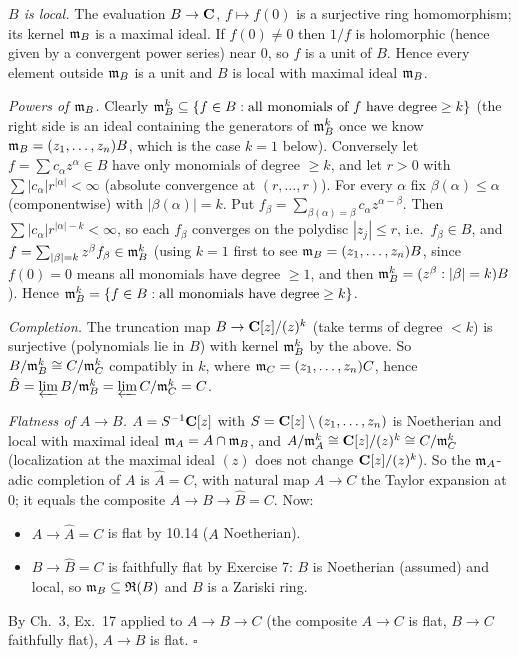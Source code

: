 \documentclass[11pt]{article}
\begin{document}
\pf
\emph{$B$ is local.} The evaluation $B\to\mathbf C$, $f\mapsto f(0)$ is a surjective ring homomorphism; its kernel $\mathfrak m_B$ is a maximal ideal. If $f(0)\ne0$ then $1/f$ is holomorphic (hence given by a convergent power series) near $0$, so $f$ is a unit of $B$. Hence every element outside $\mathfrak m_B$ is a unit and $B$ is local with maximal ideal $\mathfrak m_B$.

\emph{Powers of $\mathfrak m_B$.} Clearly $\mathfrak m_B^k\subseteq\{f\in B:\text{all monomials of }f\text{ have degree}\ge k\}$ (the right side is an ideal containing the generators of $\mathfrak m_B^k$ once we know $\mathfrak m_B=(z_1,\dots,z_n)B$, which is the case $k=1$ below). Conversely let $f=\sum c_\alpha z^\alpha\in B$ have only monomials of degree $\ge k$, and let $r>0$ with $\sum|c_\alpha|r^{|\alpha|}<\infty$ (absolute convergence at $(r,\dots,r)$). For every $\alpha$ fix $\beta(\alpha)\le\alpha$ (componentwise) with $|\beta(\alpha)|=k$. Put $f_\beta=\sum_{\beta(\alpha)=\beta}c_\alpha z^{\alpha-\beta}$. Then $\sum|c_\alpha|r^{|\alpha|-k}<\infty$, so each $f_\beta$ converges on the polydisc $|z_j|\le r$, i.e.\ $f_\beta\in B$, and $f=\sum_{|\beta|=k}z^\beta f_\beta\in\mathfrak m_B^k$ (using $k=1$ first to see $\mathfrak m_B=(z_1,\dots,z_n)B$, since $f(0)=0$ means all monomials have degree $\ge1$, and then $\mathfrak m_B^k=(z^\beta:|\beta|=k)B$). Hence $\mathfrak m_B^k=\{f\in B:\text{all monomials have degree}\ge k\}$.

\emph{Completion.} The truncation map $B\to\mathbf C[z]/(z)^k$ (take terms of degree $<k$) is surjective (polynomials lie in $B$) with kernel $\mathfrak m_B^k$ by the above. So $B/\mathfrak m_B^k\cong C/\mathfrak m_C^k$ compatibly in $k$, where $\mathfrak m_C=(z_1,\dots,z_n)C$, hence $\hat B=\varprojlim B/\mathfrak m_B^k=\varprojlim C/\mathfrak m_C^k=C$.

\emph{Flatness of $A\to B$.} $A=S^{-1}\mathbf C[z]$ with $S=\mathbf C[z]\setminus(z_1,\dots,z_n)$ is Noetherian and local with maximal ideal $\mathfrak m_A=A\cap\mathfrak m_B$, and $A/\mathfrak m_A^k\cong\mathbf C[z]/(z)^k\cong C/\mathfrak m_C^k$ (localization at the maximal ideal $(z)$ does not change $\mathbf C[z]/(z)^k$). So the $\mathfrak m_A$-adic completion of $A$ is $\hat A=C$, with natural map $A\to C$ the Taylor expansion at $0$; it equals the composite $A\to B\to\hat B=C$. Now:
\begin{itemize}[leftmargin=*]
\item $A\to\hat A=C$ is flat by 10.14 ($A$ Noetherian).
\item $B\to\hat B=C$ is faithfully flat by Exercise 7: $B$ is Noetherian (assumed) and local, so $\mathfrak m_B\subseteq\mathfrak R(B)$ and $B$ is a Zariski ring.
\end{itemize}
By Ch.~3, Ex.~17 applied to $A\to B\to C$ (the composite $A\to C$ is flat, $B\to C$ faithfully flat), $A\to B$ is flat. \hfill$\square$
\end{document}

